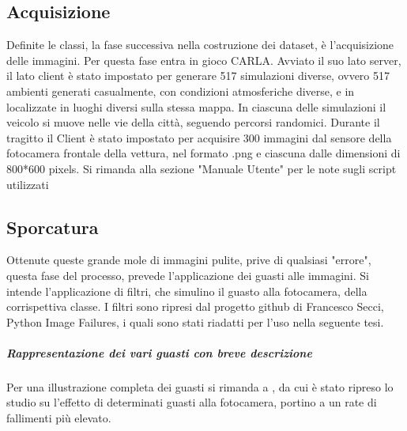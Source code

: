 \documentclass[14pt]{extarticle}
\begin{document}
\subsection{Acquisizione}
Definite le classi, la fase successiva nella costruzione dei dataset, è l'acquisizione delle immagini.
Per questa fase entra in gioco CARLA. Avviato il suo lato server, il lato client è stato impostato per generare 517 simulazioni diverse, ovvero 517 ambienti generati casualmente, con condizioni atmosferiche diverse, e in localizzate in luoghi diversi sulla stessa mappa. In ciascuna delle simulazioni il veicolo si muove nelle vie della città, seguendo percorsi randomici. Durante il tragitto il Client è stato impostato per acquisire 300 immagini dal sensore della fotocamera frontale della vettura, nel formato .png e ciascuna dalle  dimensioni di 800*600 pixels.
Si rimanda alla sezione "Manuale Utente" per le note sugli script utilizzati

\subsection{Sporcatura}
Ottenute queste grande mole di immagini pulite, prive di qualsiasi "errore", questa fase del processo, prevede l'applicazione dei guasti alle immagini.
Si intende l'applicazione di filtri, che simulino il guasto alla fotocamera, della corrispettiva classe.
I filtri sono ripresi dal progetto github di Francesco Secci, Python Image Failures, i quali sono stati riadatti per l'uso nella seguente tesi.
\subparagraph{Rappresentazione dei vari guasti con breve descrizione}
Per una illustrazione completa dei guasti si rimanda  a \cite{secci2020failures}, da cui è stato ripreso lo studio su l'effetto di determinati guasti alla fotocamera, portino a un rate di fallimenti più elevato. 
\end{document}
